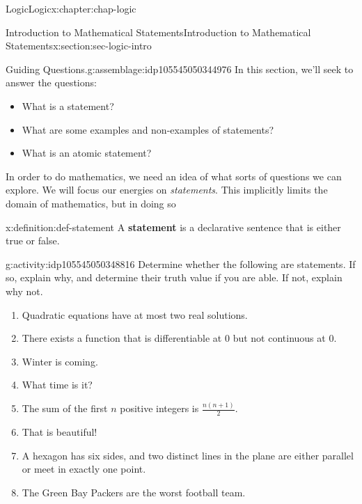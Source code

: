 \documentclass[oneside,10pt,]{book}
\newcommand{\terminology}[1]{\textbf{#1}}
\begin{document}
\begin{chapterptx}{Logic}{}{Logic}{}{}{x:chapter:chap-logic}
%
%
\typeout{************************************************}
\typeout{************************************************}
%
\begin{sectionptx}{Introduction to Mathematical Statements}{}{Introduction to Mathematical Statements}{}{}{x:section:sec-logic-intro}
\begin{assemblage}{Guiding Questions.}{g:assemblage:idp105545050344976}%
In this section, we'll seek to answer the questions: %
\begin{itemize}[label=\textbullet]
\item{}What is a statement?%
\item{}What are some examples and non-examples of statements?%
\item{}What is an atomic statement?%
\end{itemize}
%
\end{assemblage}
In order to do mathematics, we need an idea of what sorts of questions we can explore. We will focus our energies on \emph{statements}. This implicitly limits the domain of mathematics, but in doing so%
\begin{definition}{}{x:definition:def-statement}%
%
A \terminology{statement} is a declarative sentence that is either true or false.%
\end{definition}
\begin{activity}{}{g:activity:idp105545050348816}%
Determine whether the following are statements. If so, explain why, and determine their truth value if you are able. If not, explain why not.%
%
\begin{enumerate}
\item{}Quadratic equations have at most two real solutions.%
\item{}There exists a function that is differentiable at 0 but not continuous at 0.%
\item{}Winter is coming.%
\item{}What time is it?%
\item{}The sum of the first \(n\) positive integers is \(\frac{n(n+1)}{2}\).%
\item{}That is beautiful!%
\item{}A hexagon has six sides, and two distinct lines in the plane are either parallel or meet in exactly one point.%
\item{}The Green Bay Packers are the worst football team.%

\end{enumerate}
\end{activity}
\end{sectionptx}
\end{chapterptx}
\end{document}
